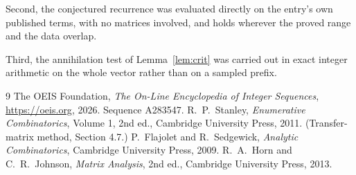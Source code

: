 \documentclass[11pt,a4paper]{article}
\theoremstyle{plain}
\theoremstyle{definition}
\begin{document}
Second, the conjectured recurrence was evaluated directly on the entry's own published terms,
with no matrices involved, and holds wherever the proved range and the data overlap.

Third, the annihilation test of Lemma~\ref{lem:crit} was carried out in exact integer
arithmetic on the whole vector rather than on a sampled prefix.

\begin{thebibliography}{9}
 The OEIS Foundation, \emph{The On-Line Encyclopedia of Integer
Sequences}, \url{https://oeis.org}, 2026. Sequence A283547.
 R.~P.~Stanley, \emph{Enumerative Combinatorics}, Volume 1, 2nd ed.,
Cambridge University Press, 2011. (Transfer-matrix method, Section 4.7.)
 P.~Flajolet and R.~Sedgewick, \emph{Analytic Combinatorics}, Cambridge
University Press, 2009.
 R.~A.~Horn and C.~R.~Johnson, \emph{Matrix Analysis}, 2nd ed., Cambridge
University Press, 2013.
\end{thebibliography}
\end{document}
